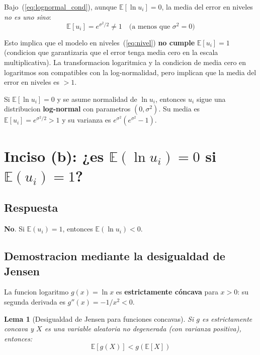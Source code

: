 \documentclass[12pt, letterpaper]{article}
\newtheorem{lema}{Lema}
\theoremstyle{remark}
\newcommand{\E}{\mathbb{E}}
\begin{document}
Bajo~(\ref{eq:lognormal_cond}), aunque $\E[\ln u_i] = 0$, la media del error
en niveles \emph{no es uno sino}:
\begin{equation}
  \E[u_i] = e^{\sigma^2/2} \neq 1 \quad \text{(a menos que } \sigma^2 = 0\text{)}
  \label{eq:media_u_no_uno}
\end{equation}

Esto implica que el modelo en niveles~(\ref{eq:nivel}) \textbf{no cumple}
$\E[u_i] = 1$ (condicion que garantizaria que el error tenga media cero en
la escala multiplicativa). La transformacion logaritmica y la condicion de media
cero en logaritmos son compatibles con la log-normalidad, pero implican que
la media del error en niveles es $> 1$.

\begin{clave}
  Si $\E[\ln u_i] = 0$ y se asume normalidad de $\ln u_i$, entonces $u_i$
  sigue una distribucion \textbf{log-normal} con parametros $(0, \sigma^2)$.
  Su media es $\E[u_i] = e^{\sigma^2/2} > 1$ y su varianza es
  $e^{\sigma^2}(e^{\sigma^2}-1)$.
\end{clave}

\section{Inciso (b): ¿es $\E(\ln u_i) = 0$ si $\E(u_i) = 1$?}

\subsection{Respuesta}

\textbf{No}. Si $\E(u_i) = 1$, entonces $\E(\ln u_i) < 0$.

\subsection{Demostracion mediante la desigualdad de Jensen}

La funcion logaritmo $g(x) = \ln x$ es \textbf{estrictamente cóncava}
para $x > 0$: su segunda derivada es $g''(x) = -1/x^2 < 0$.

\begin{lema}[Desigualdad de Jensen para funciones concavas]
  Si $g$ es estrictamente concava y $X$ es una variable aleatoria no degenerada
  (con varianza positiva), entonces:
  \begin{equation}
    \E[g(X)] < g(\E[X])
    \label{eq:Jensen}
  \end{equation}
\end{lema}
\end{document}
